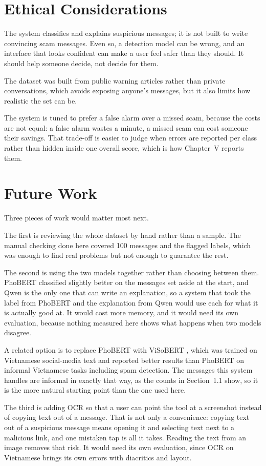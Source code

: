 \section{Ethical Considerations}

The system classifies and explains suspicious messages; it is not built to write convincing scam messages. Even so, a detection model can be wrong, and an interface that looks confident can make a user feel safer than they should. It should help someone decide, not decide for them.

The dataset was built from public warning articles rather than private conversations, which avoids exposing anyone's messages, but it also limits how realistic the set can be.

The system is tuned to prefer a false alarm over a missed scam, because the costs are not equal: a false alarm wastes a minute, a missed scam can cost someone their savings. That trade-off is easier to judge when errors are reported per class rather than hidden inside one overall score, which is how Chapter~V reports them.

\section{Future Work}
\label{sec:future-work}

Three pieces of work would matter most next.

The first is reviewing the whole dataset by hand rather than a sample. The manual checking done here covered 100 messages and the flagged labels, which was enough to find real problems but not enough to guarantee the rest.

The second is using the two models together rather than choosing between them. PhoBERT classified slightly better on the messages set aside at the start, and Qwen is the only one that can write an explanation, so a system that took the label from PhoBERT and the explanation from Qwen would use each for what it is actually good at. It would cost more memory, and it would need its own evaluation, because nothing measured here shows what happens when two models disagree.

A related option is to replace PhoBERT with ViSoBERT \cite{nguyen2023visobert}, which was trained on Vietnamese social-media text and reported better results than PhoBERT on informal Vietnamese tasks including spam detection. The messages this system handles are informal in exactly that way, as the counts in Section~1.1 show, so it is the more natural starting point than the one used here.

The third is adding OCR so that a user can point the tool at a screenshot instead of copying text out of a message. That is not only a convenience: copying text out of a suspicious message means opening it and selecting text next to a malicious link, and one mistaken tap is all it takes. Reading the text from an image removes that risk. It would need its own evaluation, since OCR on Vietnamese brings its own errors with diacritics and layout.
